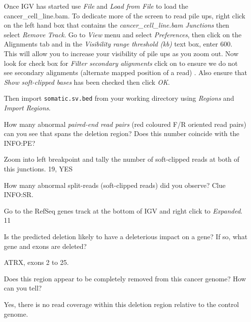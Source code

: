 \begin{information}
Once IGV has started use \emph{File} and \emph{Load from File} to load the cancer\_cell\_line.bam. To dedicate more of the screen to read pile ups, right click on the left hand box that contains the \emph{cancer\_cell\_line.bam Junctions} then select \emph{Remove Track}. Go to \emph{View} menu and select \emph{Preferences}, then click on the Alignments tab and in the \emph{Visibility range threshold (kb)} text box, enter 600. This will allow you to increase your visibility of pile ups as you zoom out. Now look for check box for \emph{Filter secondary alignments} click on to ensure we do not see secondary alignments (alternate mapped position of a read) . Also ensure that \emph{Show soft-clipped bases} has been checked then click \emph{OK}.
 
Then import \texttt{somatic.sv.bed} from your working directory using \emph{Regions} and \emph{Import Regions}. 

\end{information}


\begin{questions}
How many abnormal \emph{paired-end read pairs} (red coloured F/R oriented read pairs) can you see that spans the deletion region? Does this number coincide with the INFO:PE? 
\begin{answer}
Zoom into left breakpoint and tally the number of soft-clipped reads at both of this junctions.
19, YES
\end{answer}

How many abnormal split-reads (soft-clipped reads) did you observe? Clue INFO:SR.
\begin{answer}
Go to the RefSeq genes track at the bottom of IGV and right click to \emph{Expanded}.
11
\end{answer}
Is the predicted deletion likely to have a deleterious impact on a gene? If so, what gene and exons are deleted?
\begin{answer}
ATRX, exons 2 to 25.
\end{answer}
Does this region appear to be completely removed from this cancer genome? How can you tell?
\begin{answer}
Yes, there is no read coverage within this deletion region relative to the control genome. 
\end{answer}
\end{questions}




